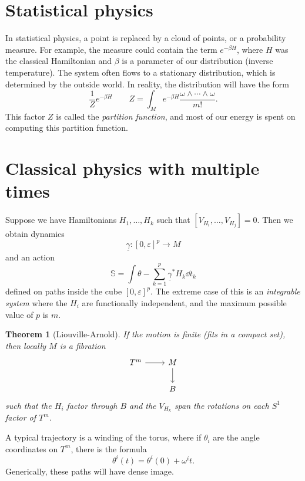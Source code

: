 \documentclass[leqno, openany]{memoir}
\newtheorem{thm}{Theorem}[section]
\theoremstyle{definition}
\theoremstyle{remark}
\theoremstyle{plain}
\theoremstyle{definition}
\theoremstyle{remark}
\newcommand{\ep}{\varepsilon}
\newcommand{\ul}[1]{\underline{#1}}
\begin{document}
\section{Statistical physics}
\label{sec:stat}

In statistical physics, a point is replaced by a cloud of points, or a probability measure. For example, the measure could contain the term $e^{-\beta H}$, where $H$ was the classical Hamiltonian and $\beta$ is a parameter of our distribution (inverse temperature). The system often flows to a stationary distribution, which is determined by the outside world. In reality, the distribution will have the form
\[ \frac{1}{Z} e^{-\beta H} \qquad Z = \int_M e^{-\beta H} \frac{\omega \wedge \cdots \wedge \omega}{m!}. \]
This factor $Z$ is called the \textit{partition function}, and most of our energy is spent on computing this partition function.

\section{Classical physics with multiple times}
\label{sec:times}

Suppose we have Hamiltonians $H_1, \ldots, H_k$ such that $[V_{H_i}, \ldots, V_{H_j}] = 0$. Then we obtain dynamics
\[ \ul{\gamma} \colon [0, \ep]^p \to M \]
and an action
\[ \mathbb{S} = \int \theta - \sum_{k=1}^p \ul{\gamma}^* H_k \dd{t_k} \]
defined on paths inside the cube $[0,\ep]^p$. The extreme case of this is an \textit{integrable system} where the $H_i$ are functionally independent, and the maximum possible value of $p$ is $m$.

\begin{thm}[Liouville-Arnold]
  If the motion is finite (fits in a compact set), then locally $M$ is a fibration
  \begin{equation*}
    \begin{tikzcd}
      T^m \ar{r} & M \ar{d} \\
      & B
    \end{tikzcd}
  \end{equation*}
  such that the $H_i$ factor through $B$ and the $V_{H_k}$ span the rotations on each $S^1$ factor of $T^m$.
\end{thm}

A typical trajectory is a winding of the torus, where if $\theta_i$ are the angle coordinates on $T^m$, there is the formula
\[ \theta^i(t) = \theta^i(0) + \omega^i t. \]
Generically, these paths will have dense image.
\end{document}
